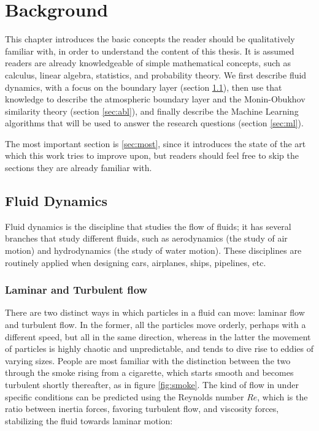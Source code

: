 \documentclass[a4paper]{book}
\begin{document}
\chapter{Background}
\label{ch:background}
This chapter introduces the basic concepts the reader should be qualitatively familiar with, in order to understand the content of this thesis. It is assumed readers are already knowledgeable of simple mathematical concepts, such as calculus, linear algebra, statistics, and probability theory. We first describe fluid dynamics, with a focus on the boundary layer (section \ref{sec:fluids}), then use that knowledge to describe the atmospheric boundary layer and the Monin-Obukhov similarity theory (section \ref{sec:abl}), and finally describe the Machine Learning algorithms that will be used to answer the research questions (section \ref{sec:ml}). 

The most important section is \ref{sec:most}, since it introduces the state of the art which this work tries to improve upon, but readers should feel free to skip the sections they are already familiar with.

\section{Fluid Dynamics}
\label{sec:fluids}
Fluid dynamics is the discipline that studies the flow of fluids; it has several branches that study different fluids, such as aerodynamics (the study of air motion) and hydrodynamics (the study of water motion). These disciplines are routinely applied when designing cars, airplanes, ships, pipelines, etc.

\subsection{Laminar and Turbulent flow}
There are two distinct ways in which particles in a fluid can move: laminar flow and turbulent flow. In the former, all the particles move orderly, perhaps with a different speed, but all in the same direction, whereas in the latter the movement of particles is highly chaotic and unpredictable, and tends to dive rise to eddies of varying sizes. People are most familiar with the distinction between the two through the smoke rising from a cigarette, which starts smooth and becomes turbulent shortly thereafter, as in figure \ref{fig:smoke}. The kind of flow in under specific conditions can be predicted using the Reynolds number $Re$, which is the ratio between inertia forces, favoring turbulent flow, and viscosity forces, stabilizing the fluid towards laminar motion:
\end{document}
